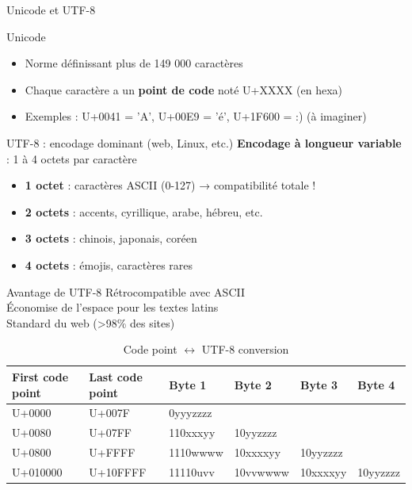 \documentclass[aspectratio=1610]{beamer}
\begin{document}
\begin{frame}[allowframebreaks]{Unicode et UTF-8}

  \begin{block}{Unicode}
    \begin{itemize}
      \item Norme définissant plus de 149 000 caractères
      \item Chaque caractère a un \textbf{point de code} noté U+XXXX (en hexa)
      \item Exemples : U+0041 = 'A', U+00E9 = 'é', U+1F600 = :) (à imaginer)
    \end{itemize}
  \end{block}


  \begin{block}{UTF-8 : encodage dominant (web, Linux, etc.)}
    \textbf{Encodage à longueur variable} : 1 à 4 octets par caractère

    \begin{itemize}
      \item \textbf{1 octet} : caractères ASCII (0-127) → compatibilité totale !
      \item \textbf{2 octets} : accents, cyrillique, arabe, hébreu, etc.
      \item \textbf{3 octets} : chinois, japonais, coréen
      \item \textbf{4 octets} : émojis, caractères rares
    \end{itemize}
  \end{block}

  \framebreak
  \begin{exampleblock}{Avantage de UTF-8}
     Rétrocompatible avec ASCII \\
     Économise de l'espace pour les textes latins \\
     Standard du web (>98\% des sites)
  \end{exampleblock}

\begin{table}
\captionsetup{labelformat=empty}
\caption{Code point $\leftrightarrow$ UTF-8 conversion}
\begin{tabular}{|l|l|l|l|l|l|}
\hline First code point & Last code point & Byte 1 & Byte 2 & Byte 3 & Byte 4 \\
\hline U+0000 & U+007F & 0yyyzzzz & & & \\
\hline U+0080 & U+07FF & 110xxxyy & 10yyzzzz & & \\
\hline U+0800 & U+FFFF & 1110wwww & 10xxxxyy & 10yyzzzz & \\
\hline U+010000 & U+10FFFF & 11110uvv & 10vvwwww & 10xxxxyy & 10yyzzzz \\
\hline
\end{tabular}
\end{table}

\end{frame}
\end{document}

